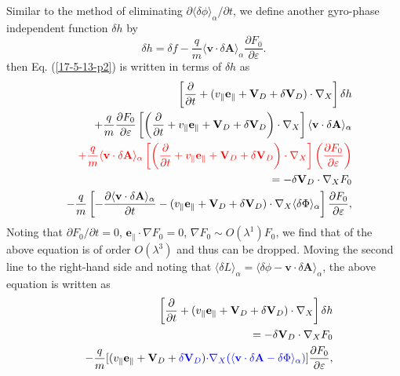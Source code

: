 \documentclass{llncs}
\newcommand{\tmcolor}[2]{{\color{#1}{#2}}}
\begin{document}
Similar to the method of eliminating $\partial \langle \delta \phi
\rangle_{\alpha} / \partial t$, we define another gyro-phase independent
function $\delta h$ by
\begin{equation}
  \delta h = \delta f - \frac{q}{m} \langle \mathbf{v} \cdot \delta \mathbf{A}
  \rangle_{\alpha} \frac{\partial F_0}{\partial \varepsilon} .
\end{equation}
then Eq. (\ref{17-5-13-p2}) is written in terms of $\delta h$ as
\begin{eqnarray}
  &  & \left[ \frac{\partial}{\partial t} + (v_{\parallel}
  \mathbf{e}_{\parallel} +\mathbf{V}_D + \delta \mathbf{V}_D) \cdot \nabla_X
  \right] \delta h \nonumber\\
  &  & + \frac{q}{m}  \frac{\partial F_0}{\partial \varepsilon} \left[ \left(
  \frac{\partial}{\partial t} + v_{\parallel} \mathbf{e}_{\parallel}
  +\mathbf{V}_D + \delta \mathbf{V}_D \right) \cdot \nabla_X \right] \langle
  \mathbf{v} \cdot \delta \mathbf{A} \rangle_{\alpha} \nonumber\\
  &  & \tmcolor{red}{+ \frac{q}{m} \langle \mathbf{v} \cdot \delta \mathbf{A}
  \rangle_{\alpha} \left[ \left( \frac{\partial}{\partial t} + v_{\parallel}
  \mathbf{e}_{\parallel} +\mathbf{V}_D + \delta \mathbf{V}_D \right) \cdot
  \nabla_X \right] \left( \frac{\partial F_0}{\partial \varepsilon} \right)}
  \nonumber\\
  &  & = - \delta \mathbf{V}_D \cdot \nabla_X F_0 \nonumber\\
  &  & - \frac{q}{m} \left[ - \frac{\partial \langle \mathbf{v} \cdot \delta
  \mathbf{A} \rangle_{\alpha}}{\partial t} - (v_{\parallel}
  \mathbf{e}_{\parallel} +\mathbf{V}_D + \delta \mathbf{V}_D) \cdot \nabla_X
  \langle \delta \Phi \rangle_{\alpha} \right] \frac{\partial F_0}{\partial
  \varepsilon}, 
\end{eqnarray}
Noting that $\partial F_0 / \partial t = 0$, $\mathbf{e}_{\parallel} \cdot
\nabla F_0 = 0$, $\nabla F_0 \sim O (\lambda^1) F_0$, we find that
\tmcolor{red}{the third line} of the above equation is of order $O
(\lambda^3)$ and thus can be dropped. Moving the second line to the right-hand
side and noting that $\langle \delta L \rangle_{\alpha} = \langle \delta \phi
-\mathbf{v} \cdot \delta \mathbf{A} \rangle_{\alpha}$, the above equation is
written as
\begin{eqnarray}
  &  & \left[ \frac{\partial}{\partial t} + (v_{\parallel}
  \mathbf{e}_{\parallel} +\mathbf{V}_D + \delta \mathbf{V}_D) \cdot \nabla_X
  \right] \delta h \nonumber\\
  &  & = - \delta \mathbf{V}_D \cdot \nabla_X F_0 \nonumber\\
  &  & - \frac{q}{m} [(v_{\parallel} \mathbf{e}_{\parallel} +\mathbf{V}_D +
  \tmcolor{blue}{\delta \mathbf{V}_D}) \tmcolor{blue}{\cdot \nabla_X (\langle
  \mathbf{v} \cdot \delta \mathbf{A}- \delta \Phi \rangle_{\alpha})}]
  \frac{\partial F_0}{\partial \varepsilon},  \label{19-1-3-e1}
\end{eqnarray}
\end{document}
